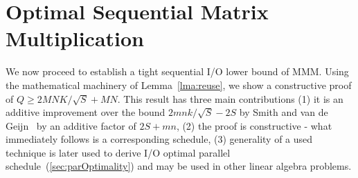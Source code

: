 \section{\hspace{-0.5em}Optimal Sequential Matrix Multiplication}
\label{sec:seqOptimality}

We now proceed to establish a tight sequential I/O lower bound of MMM. Using 
the 
mathematical machinery of 
Lemma~\ref{lma:reuse}, we show a constructive proof of $Q \ge 2MNK/\sqrt{S} + 
MN$. This result has three main contributions (1) it is an additive 
improvement 
over the bound $2mnk/\sqrt{S} - 2S$ by Smith and van de Geijn~\cite{tightMMM} 
by an
additive factor of $2S + mn$, (2) the proof is constructive - what immediately 
follows is a corresponding schedule, (3) generality of a used technique is 
later used to derive I/O optimal parallel schedule~(\cref{sec:parOptimality}) 
and may be used in other 
linear algebra problems.
%
%
%
%

